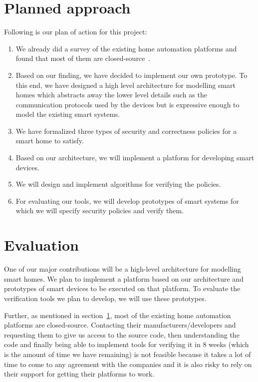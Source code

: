\documentclass{article}
\begin{document}
\section{Planned approach}
\label{sec:plannedapp}
Following is our plan of action for this project:
\begin{enumerate}
\item We already did a survey of the existing home automation platforms and found that most of them are closed-source~\cite{homeos, echo, wink, homekit, samsung}.  
\item Based on our finding, we have decided to implement our own prototype. To this end, we have designed a high level architecture for modelling smart homes which abstracts away the lower level details such as the communication protocols used by the devices but is expressive enough to model the existing smart systems. 
\item  We have formalized three types of security and correctness policies for a smart home to satisfy. 
\item Based on our architecture, we will implement a platform for developing smart devices.
\item We will design and implement algorithms for verifying the policies.
\item For evaluating our tools, we will develop prototypes of smart systems for which we will specify security policies and verify them.
\end{enumerate}

\section{Evaluation}
One of our major contributions will be a high-level architecture for modelling smart homes. We plan to implement a platform based on our architecture and prototypes of smart devices to be executed on that platform. To evaluate the verification tools we plan to develop, we will use these prototypes. 

Further, as mentioned in section~\ref{sec:plannedapp}, most of the existing home automation platforms are closed-source. Contacting their manufacturers/developers and requesting them to give us access to the source code, then understanding the code and finally being able to implement tools for verifying it in 8 weeks (which is the amount of time we have remaining) is not feasible because it takes a lot of time to come to any agreement with the companies and it is also risky to rely on their support for getting their platforms to work.    
\end{document}
